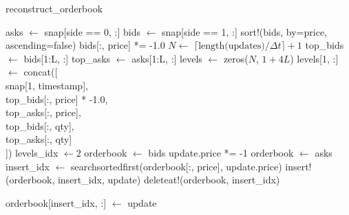 \documentclass[a4paper, oneside, notitlepage]{book}
\begin{document}
\begin{algorithm*}
\caption{reconstruct\_orderbook}
\begin{algorithmic}[1]
    \State asks $\gets$ snap[side == 0, :]
    \State bids $\gets$ snap[side == 1, :]
    \State sort!(bids, by=price, ascending=false) 
    \State bids[:, price] *= -1.0 
    \State $N \gets$ $\lceil \text{length(updates)} / \Delta t \rceil+ 1$ 
    \State top\_bids $\gets$ bids[1:L, :] 
    \State top\_asks $\gets$ asks[1:L, :]
    \State levels $\gets$ zeros($N$, $1 + 4L$)  
    \State levels[1, :] $\gets$ concat([  \\
    \hspace{35pt}  snap[1, timestamp], \\
    \hspace{35pt}  top\_bids[:, price] * -1.0, \\
    \hspace{35pt}  top\_asks[:, price],\\
    \hspace{35pt}  top\_bids[:, qty],\\
    \hspace{35pt}  top\_asks[:, qty]\\
    \hspace{16pt}])
    \State levels\_idx $\gets 2$
     
            \State orderbook $\gets$ bids  
            \State update.price *= -1  
        \Else
            \State orderbook $\gets$ asks
        \EndIf
        \State insert\_idx $\gets$ searchsortedfirst(orderbook[:, price], update.price)
            \State insert!(orderbook, insert\_idx, update) 
             
            \State deleteat!(orderbook, insert\_idx)

            \Else  {}             
            \State orderbook[insert\_idx, :] $\gets$ update
        \EndIf \\


\end{algorithmic}
\end{algorithm*}
\end{document}
